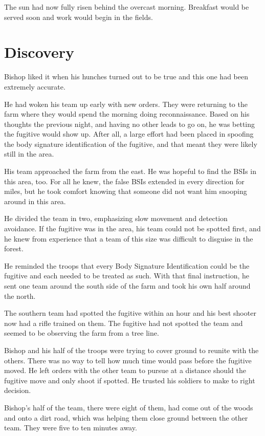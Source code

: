 \documentclass[courier]{sffms}
\begin{document}
The sun had now fully risen behind the overcast
morning. Breakfast would be served soon and work
would begin in the fields.

\chapter{Discovery}
Bishop liked it when his hunches turned out to be
true and this one had been extremely accurate.

He had woken his team up early with new orders.
They were returning to the farm where they would
spend the morning doing reconnaissance. Based
on his thoughts the previous night, and having no
other leads to go on, he was betting the fugitive
would show up. After all, a large effort had been
placed in spoofing the body signature identification
of the fugitive, and that meant they were likely still in
the area.

His team approached the farm from the east. He was
hopeful to find the BSIs in this area, too. For all he
knew, the false BSIs extended in every direction for
miles, but he took comfort knowing that someone
did not want him snooping around in this area.

He divided the team in two, emphasizing slow movement
and detection avoidance. If the fugitive was in the
area, his team could not be spotted first, and he
knew from experience that a team of this size was
difficult to disguise in the forest.

He reminded the troops that every Body Signature
Identification could be the fugitive and each needed
to be treated as such. With that final instruction, he
sent one team around the south side of the farm and
took his own half around the north.

The southern team had spotted the fugitive
within an hour and his best shooter now had a rifle
trained on them. The fugitive had not spotted the team
and seemed to be observing the farm from a tree line.

Bishop and his half of the troops were trying to cover
ground to reunite with the others. There was no way
to tell how much time would pass before the fugitive
moved. He left orders with the other team to pursue
at a distance should the fugitive move and only shoot
if spotted. He trusted his soldiers to make to right
decision.

Bishop's half of the team, there were eight of them,
had come out of the woods and onto a dirt road, which
was helping them close ground between the other team. 
They were five to ten minutes away.
\end{document}
